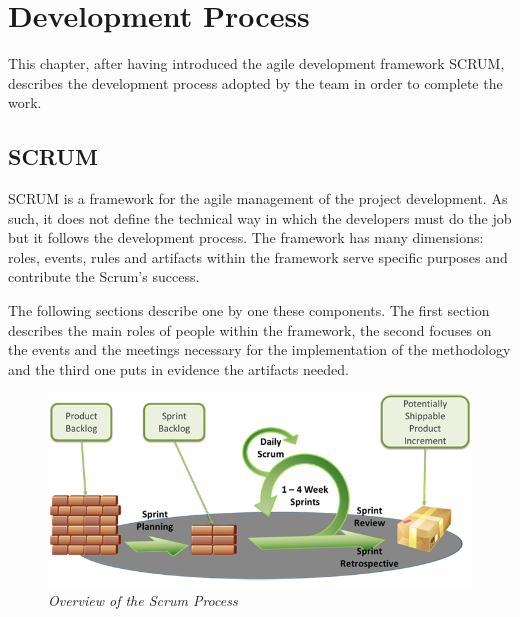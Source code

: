\chapter{Development Process}
This chapter, after having introduced the agile development framework SCRUM, describes the development process adopted by the team in order to complete the work.

	\section{SCRUM}\label{ref_scrum}
	SCRUM is a framework for the agile management of the project development. 
	As such, it does not define the technical way in which the developers must do the job but it follows the development process. 	
	The framework has many dimensions: roles, events, rules and artifacts within the framework serve specific purposes and contribute the Scrum's success. 

	The following sections describe one by one these components. The first section describes the main roles of people within the framework, the second focuses on the events and the meetings necessary for the implementation of the methodology and the third one puts in evidence the artifacts needed.

	\begin{figure}[h]
	  \begin{center} 
	    \includegraphics[scale=0.45]{images/ch_04/scrum_overview.png}
	  \end{center} 
	  \caption{\textit{Overview of the Scrum Process}}  
	  \label{fig:ScrumOverview}
  	\end{figure}

\newpage

